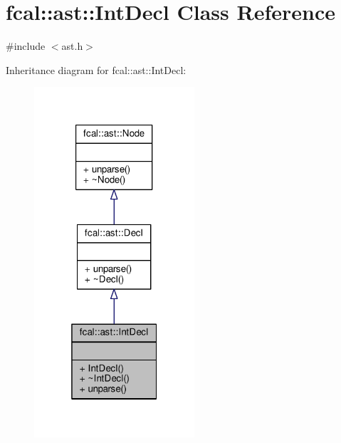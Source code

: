 \hypertarget{classfcal_1_1ast_1_1IntDecl}{}\section{fcal\+:\+:ast\+:\+:Int\+Decl Class Reference}
\label{classfcal_1_1ast_1_1IntDecl}


{\ttfamily \#include $<$ast.\+h$>$}



Inheritance diagram for fcal\+:\+:ast\+:\+:Int\+Decl\+:
\nopagebreak
\begin{figure}[H]
\begin{center}
\leavevmode
\includegraphics[width=169pt]{classfcal_1_1ast_1_1IntDecl__inherit__graph}
\end{center}
\end{figure}



